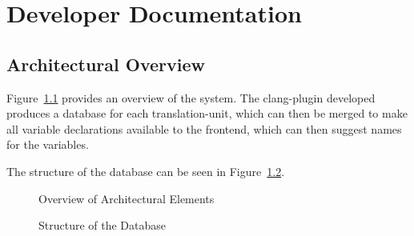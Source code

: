 \chapter{Developer Documentation}
\label{chapter:DevDoc}

\section{Architectural Overview}
\label{sec:Arch}

Figure~\ref{fig:Arch} provides an overview of the system. The clang-plugin
developed produces a database for each translation-unit, which can then be
merged to make all variable declarations available to the frontend, which can
then suggest names for the variables.

The structure of the database can be seen in Figure~\ref{fig:Database}.

\begin{figure}
	\label{fig:Arch}
	\caption{Overview of Architectural Elements}
	\begin{center}
	\end{center}
\end{figure}

\begin{figure}
	\label{fig:Database}
	\caption{Structure of the Database}
	\begin{center}
	\end{center}
\end{figure}
